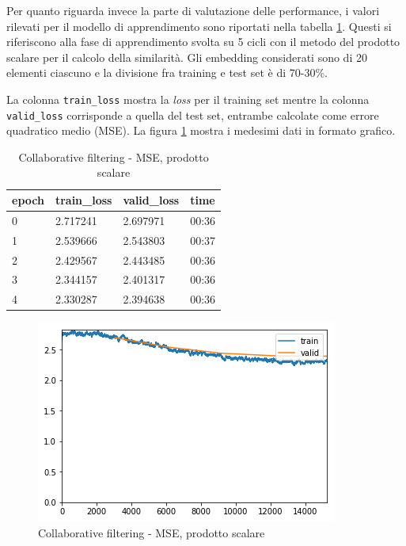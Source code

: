 \documentclass[hidelinks, 12pt]{article}
\begin{document}
Per quanto riguarda invece la parte di valutazione delle performance, i valori rilevati per il modello di apprendimento sono riportati nella tabella \ref{tab:collab-dot-loss}. Questi si riferiscono alla fase di apprendimento svolta su 5 cicli con il metodo del prodotto scalare per il calcolo della similarità. Gli embedding considerati sono di 20 elementi ciascuno e la divisione fra training e test set è di 70-30\%.

La colonna \texttt{train\_loss} mostra la \textit{loss} per il training set mentre la colonna \texttt{valid\_loss} corrisponde a quella del test set, entrambe calcolate come errore quadratico medio (MSE). La figura \ref{fig:collab-dot-loss} mostra i medesimi dati in formato grafico.

\begin{table}[H]
	\caption{Collaborative filtering - MSE, prodotto scalare}\label{tab:collab-dot-loss}
	\centering
	\begin{tabular}{|l|l|l|l|}
		\hline
		epoch & train\_loss & valid\_loss & time \\ 
		\hline
		0 & 2.717241 & 2.697971 & 00:36 \\ 
		1 & 2.539666 & 2.543803 & 00:37 \\ 
		2 & 2.429567 & 2.443485 & 00:36 \\ 
		3 & 2.344157 & 2.401317 & 00:36 \\ 
		4 & 2.330287 & 2.394638 & 00:36 \\ 
		\hline
	\end{tabular}
\end{table}

\begin{figure}[H]
	\centering
	\includegraphics[scale=0.6]{images/07_02_loss_dot.png}
	\caption[Collaborative filtering - MSE, prodotto scalare]{Collaborative filtering - MSE, prodotto scalare}
	\label{fig:collab-dot-loss}
\end{figure}
\end{document}
